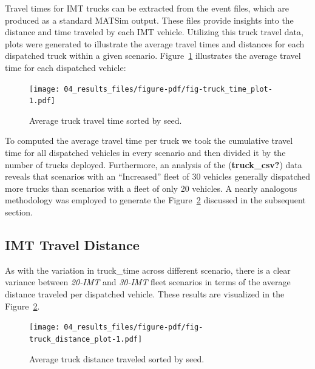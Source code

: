 \documentclass[fancy, oneside, mastersfancy, ms]{byuthesis}
\begin{document}
Travel times for IMT trucks can be extracted from the event files, which
are produced as a standard MATSim output. These files provide insights
into the distance and time traveled by each IMT vehicle. Utilizing this
truck travel data, plots were generated to illustrate the average travel
times and distances for each dispatched truck within a given scenario.
Figure~\ref{fig-truck_time_plot} illustrates the average travel time for
each dispatched vehicle:

\begin{figure}

{\centering \texttt{[image: 04\_results\_files/figure-pdf/fig-truck\_time\_plot-1.pdf]}

}

\caption{\label{fig-truck_time_plot}Average truck travel time sorted by
seed.}

\end{figure}

To computed the average travel time per truck we took the cumulative
travel time for all dispatched vehicles in every scenario and then
divided it by the number of trucks deployed. Furthermore, an analysis of
the (\textbf{truck\_csv?}) data reveals that scenarios with an
``Increased'' fleet of 30 vehicles generally dispatched more trucks than
scenarios with a fleet of only 20 vehicles. A nearly analogous
methodology was employed to generate the
Figure~\ref{fig-truck_distance_plot} discussed in the subsequent
section.

\hypertarget{imt-travel-distance}{%
\subsection{IMT Travel Distance}\label{imt-travel-distance}}

As with the variation in truck\_time across different scenario, there is
a clear variance between \emph{20-IMT} and \emph{30-IMT} fleet scenarios
in terms of the average distance traveled per dispatched vehicle. These
results are visualized in the Figure~\ref{fig-truck_distance_plot}.

\begin{figure}

{\centering \texttt{[image: 04\_results\_files/figure-pdf/fig-truck\_distance\_plot-1.pdf]}

}

\caption{\label{fig-truck_distance_plot}Average truck distance traveled
sorted by seed.}

\end{figure}
\end{document}
